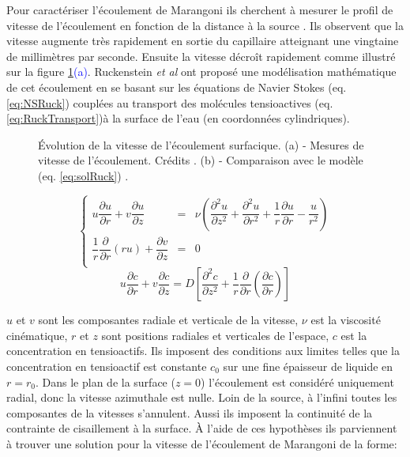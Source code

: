   Pour caractériser l'écoulement de Marangoni ils cherchent à mesurer le profil de vitesse de l'écoulement en fonction de la distance à la source \cite{Suciu1969}. Ils observent que la vitesse augmente très rapidement en sortie du capillaire atteignant une vingtaine de millimètres par seconde. Ensuite la vitesse décroît rapidement comme illustré sur la figure \ref{fig:suciu1969}\textcolor{blue}{(a)}. Ruckenstein \textit{et al} \cite{Ruckenstein1970} ont proposé une modélisation mathématique de cet écoulement en se basant sur les équations de Navier Stokes (eq. \eqref{eq:NSRuck}) couplées au transport des molécules tensioactives (eq. \eqref{eq:RuckTransport})à la surface de l'eau (en coordonnées cylindriques). 
  \begin{figure}[!ht]
    \centering
    
    \caption{Évolution de la vitesse de l'écoulement surfacique. (a) - Mesures de vitesse de l'écoulement. Crédits \cite{Suciu1969}. (b) - Comparaison avec le modèle (eq. \eqref{eq:solRuck}) \cite{Ruckenstein1970}.}
    \label{fig:suciu1969}
  \end{figure}
  \begin{equation}
      \left\{
        \begin{array}{rcl}
        u\dfrac{\partial u}{\partial r}+v\dfrac{\partial u}{\partial z} &=& \nu\left(\dfrac{\partial ^2 u}{\partial z^2}+\dfrac{\partial ^2 u}{\partial r^2}+ \dfrac{1}{r}\dfrac{\partial u}{\partial r} - \dfrac{u}{r^2}\right)\label{eq:NSRuck}\\
        \dfrac{1}{r}\dfrac{\partial}{\partial r}(ru)+\dfrac{\partial v}{\partial z} &=&0\\
        \end{array}
        \right.
  \end{equation}
  \begin{equation}
    u\frac{\partial c}{\partial r} + v \frac{\partial c}{\partial z} = D \left[\frac{\partial ^2 c}{\partial z^2}+\frac{1}{r}\dfrac{\partial }{\partial r}\left( \frac{\partial c}{\partial r}\right) \right] \label{eq:RuckTransport}
  \end{equation}
  
  $u$  et $v$ sont les composantes radiale et verticale de la vitesse, $\nu$ est la viscosité cinématique, $r$ et $z$ sont positions radiales et verticales de l'espace, $c$ est la concentration en tensioactifs. Ils imposent des conditions aux limites telles que la concentration en tensioactif est constante $c_0$ sur une fine épaisseur de liquide en $r=r_0$. Dans le plan de la surface ($z=0$) l'écoulement est considéré uniquement radial, donc la vitesse azimuthale est nulle. Loin de la source, à l'infini toutes les composantes de la vitesses s'annulent. Aussi ils imposent la continuité de la contrainte de cisaillement à la surface. À l'aide de ces hypothèses ils parviennent à trouver une solution pour la vitesse de l'écoulement de Marangoni de la forme:
  

